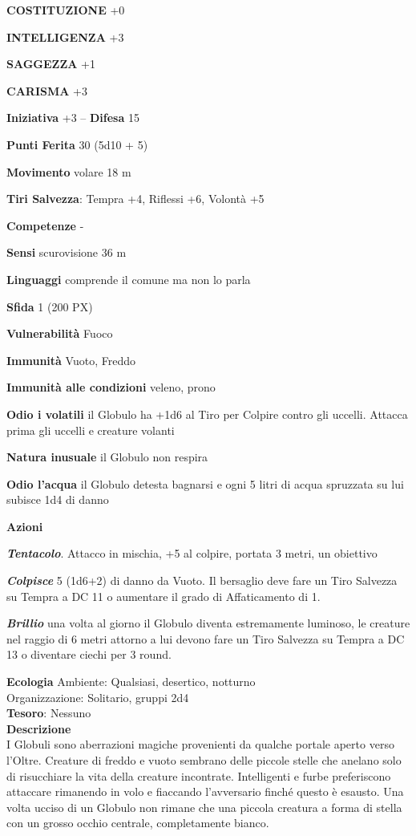 \begin{multicols}{2}
	\textbf{COSTITUZIONE} +0

	\textbf{INTELLIGENZA} +3

	\textbf{SAGGEZZA} +1

	\textbf{CARISMA} +3

	\textbf{Iniziativa} +3 -- \textbf{Difesa} 15

	\textbf{Punti Ferita} 30 (5d10 + 5)

	\textbf{Movimento} volare 18 m

	\textbf{Tiri Salvezza}: Tempra +4, Riflessi +6, Volontà +5

	\textbf{Competenze} -

	\textbf{Sensi} scurovisione 36 m

	\textbf{Linguaggi} comprende il comune ma non lo parla

	\textbf{Sfida} 1 (200 PX)

	\textbf{Vulnerabilità} Fuoco

	\textbf{Immunità} Vuoto, Freddo

	\textbf{Immunità alle condizioni} veleno, prono

	\textbf{Odio i volatili} il Globulo ha +1d6 al Tiro per Colpire contro gli uccelli. Attacca prima gli uccelli e creature volanti

	\textbf{Natura inusuale} il Globulo non respira

	\textbf{Odio l'acqua} il Globulo detesta bagnarsi e ogni 5 litri di acqua spruzzata su lui subisce 1d4 di danno

	\textbf{Azioni}

	\textit{\textbf{Tentacolo}}. Attacco in mischia, +5 al colpire, portata 3 metri, un obiettivo

	\textit{\textbf{Colpisce}} 5 (1d6+2) di danno da Vuoto. Il bersaglio deve fare un Tiro Salvezza su Tempra a DC 11 o aumentare il grado di Affaticamento di 1.

	\textbf{\textit{Brillio}} una volta al giorno il Globulo diventa estremamente luminoso, le creature nel raggio di 6 metri attorno a lui devono fare un Tiro Salvezza su Tempra a DC 13 o diventare ciechi per 3 round.

	\textbf{Ecologia}
	Ambiente: Qualsiasi, desertico, notturno\\
	Organizzazione: Solitario, gruppi 2d4\\
	\textbf{Tesoro}: Nessuno\\
	\textbf{Descrizione}\\
	I Globuli sono aberrazioni magiche provenienti da qualche portale aperto verso l'Oltre. Creature di freddo e vuoto sembrano delle piccole stelle che anelano solo di risucchiare la vita della creature incontrate.
	Intelligenti e furbe preferiscono attaccare rimanendo in volo e fiaccando l'avversario finché questo è esausto. Una volta ucciso di un Globulo non rimane che una piccola creatura a forma di stella con un grosso occhio centrale, completamente bianco.



\end{multicols}
